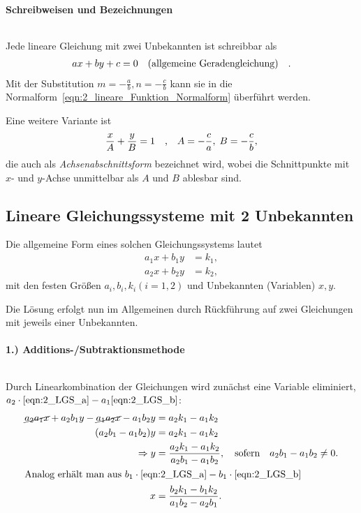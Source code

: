 \paragraph{Schreibweisen und Bezeichnungen}$~$

Jede lineare Gleichung mit zwei Unbekannten ist schreibbar als 
\begin{align}
    a x + b y + c = 0 \qq{(allgemeine Geradengleichung)}.
\end{align}
Mit der Substitution $m = -\frac{a}{b}, n = -\frac{c}{b}$ kann sie in die Normalform~\eqref{eqn:2_lineare_Funktion_Normalform} überführt werden. 

Eine weitere Variante ist 
\begin{align}
    \frac{x}{A} + \frac{y}{B} = 1 \qq{,} A = -\frac{c}{a},\; B = -\frac{c}{b},
\end{align}
die auch als \emph{Achsenabschnittsform} bezeichnet wird, wobei die Schnittpunkte mit $x$- und $y$-Achse unmittelbar als $A$ und $B$ ablesbar sind.

\subsection{Lineare Gleichungssysteme mit 2 Unbekannten}

Die allgemeine Form eines solchen Gleichungssystems lautet 
\begin{subequations}
\begin{align}
        a_1 x + b_1 y &= k_1, \label{eqn:2_LGS_a}\\
        a_2 x + b_2 y &= k_2, \label{eqn:2_LGS_b}
    \end{align}
\end{subequations}
mit den festen Größen $a_i, b_i, k_i (i=1,2)$ und Unbekannten (Variablen) $x,y$.

Die Lösung erfolgt nun im Allgemeinen durch Rückführung auf zwei Gleichungen mit jeweils einer Unbekannten. 

\paragraph{1.) Additions-/Subtraktionsmethode}$~$

Durch Linearkombination der Gleichungen wird zunächst eine Variable eliminiert, $a_2 \cdot \eqref{eqn:2_LGS_a} - a_1 \eqref{eqn:2_LGS_b}$: 
\begin{align}
    \cancel{a_2 a_1 x} + a_2 b_1 y - \cancel{a_1a_2 x} - a_1 b_2 y &= a_2 k_1 -a_1 k_2 \notag \\
    (a_2 b_1 -a_1 b_2) y &= a_2 k_1 - a_1 k_2 \notag \\
    \Rightarrow y &= \frac{a_2 k_1 - a_1 k_2}{a_2 b_1 - a_1 b_2}, \qq{sofern} a_2 b_1 - a_1 b_2 \neq 0.\\
\intertext{Analog erhält man aus $b_1\cdot \eqref{eqn:2_LGS_a} - b_1 \cdot \eqref{eqn:2_LGS_b}$}
    x &= \frac{b_2 k_1 - b_1 k_2}{a_1 b_2 -a_2 b_1}.
\end{align}

